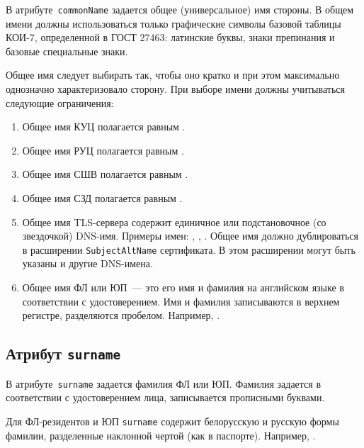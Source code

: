 В атрибуте~\texttt{commonName} задается общее (универсальное) имя стороны.
В общем имени должны использоваться только графические символы базовой 
таблицы КОИ-7, определенной в ГОСТ 27463: латинские буквы, 
знаки препинания и базовые специальные знаки.
 
Общее имя следует выбирать так, чтобы оно кратко 
и при этом максимально однозначно характеризовало сторону. 
При выборе имени должны учитываться следующие ограничения:
\begin{enumerate}
\item
Общее имя КУЦ полагается равным .
\item
Общее имя РУЦ полагается равным .
\item
Общее имя СШВ полагается равным .
\item
Общее имя СЗД полагается равным .
\item
Общее имя TLS-сервера содержит единичное или подстановочное (со звездочкой) 
DNS-имя. Примеры имен: , , .
%
Общее имя должно дублироваться в расширении \texttt{SubjectAltName} 
сертификата. В этом расширении могут быть указаны и другие DNS-имена.
\item
Общее имя ФЛ или ЮП~--- это его имя и фамилия на английском языке в 
соответствии с удостоверением.
Имя и фамилия записываются в верхнем регистре, разделяются пробелом.
Например, .
\end{enumerate}

\subsection{Атрибут \texttt{surname}}\label{ENTITIES.Id.S}

В атрибуте~\texttt{surname} задается фамилия ФЛ или ЮП.
Фамилия задается в соответствии с удостоверением лица,
записывается прописными буквами.

Для ФЛ-резидентов и ЮП \texttt{surname} содержит белорусскую и русскую 
формы фамилии, разделенные наклонной чертой (как в паспорте).
Например, .


